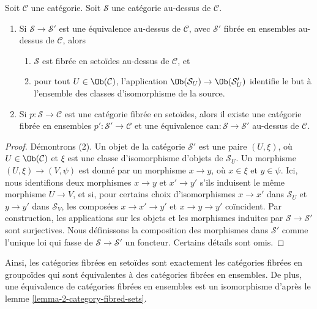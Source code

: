 \begin{lemma}
\label{lemma-setoid-fibres}
Soit $\mathcal{C}$ une catégorie. Soit $\mathcal{S}$ une catégorie
au-dessus de $\mathcal{C}$.
\begin{enumerate}
\item Si $\mathcal{S} \to \mathcal{S}'$ est une équivalence
au-dessus de $\mathcal{C}$, avec $\mathcal{S}'$ fibrée en ensembles au-dessus
de $\mathcal{C}$, alors
\begin{enumerate}
\item $\mathcal{S}$ est fibrée en setoïdes au-dessus de
$\mathcal{C}$, et
\item pour tout $U \in \Ob(\mathcal{C})$, l'application
$\Ob(\mathcal{S}_U) \to \Ob(\mathcal{S}'_U)$
identifie le but à l'ensemble des classes d'isomorphisme de la source.
\end{enumerate}
\item Si $p : \mathcal{S} \to \mathcal{C}$ est une catégorie fibrée en
setoïdes, alors il existe une catégorie fibrée en ensembles
$p' : \mathcal{S}' \to \mathcal{C}$ et une équivalence
$\text{can} : \mathcal{S} \to \mathcal{S}'$ au-dessus de $\mathcal{C}$.
\end{enumerate}
\end{lemma}

\begin{proof}
Démontrons (2).
Un objet de la catégorie $\mathcal{S}'$ est une paire $(U, \xi)$, où
$U \in \Ob(\mathcal{C})$ et $\xi$ est une classe d'isomorphisme d'objets
de $\mathcal{S}_U$. Un morphisme $(U, \xi) \to (V , \psi)$ est donné par un
morphisme $x \to y$, où $x \in \xi$ et $y \in \psi$. Ici, nous identifions
deux morphismes $x \to y$ et $x' \to y'$ s'ils induisent le même morphisme
$U \to V$, et si, pour certains choix d'isomorphismes $x \to x'$ dans
$\mathcal{S}_U$ et $y \to y'$ dans $\mathcal{S}_V$, les composées
$x \to x' \to y'$ et $x \to y \to y'$ coïncident. Par construction, les
applications sur les objets et les morphismes induites par $\mathcal{S} \to
\mathcal{S}'$ sont surjectives. Nous définissons la composition des morphismes dans
$\mathcal{S}'$ comme l'unique loi qui fasse de $\mathcal{S} \to \mathcal{S}'$
un foncteur. Certains détails sont omis.
\end{proof}

\noindent
Ainsi, les catégories fibrées en setoïdes sont exactement les
catégories fibrées en groupoïdes qui sont équivalentes à des catégories fibrées
en ensembles. De plus, une équivalence de catégories fibrées en ensembles est
un isomorphisme d'après le lemme \ref{lemma-2-category-fibred-sets}.


